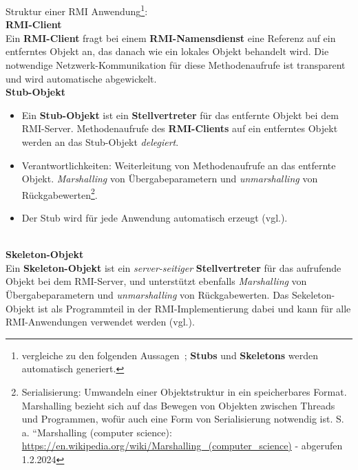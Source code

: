 \begin{tcolorbox}[enlarge top by=0.5cm,enlarge bottom by=0.5cm]
    Struktur einer RMI Anwendung\footnote{vergleiche zu den folgenden Aussagen~\cite[162 ff.]{HM05}; \textbf{Stubs} und \textbf{Skeletons} werden automatisch generiert.}:\\


    \noindent
    \textbf{RMI-Client}\\
    Ein \textbf{RMI-Client} fragt bei einem \textbf{RMI-Namensdienst} eine Referenz auf ein entferntes Objekt an, das danach wie ein lokales Objekt behandelt wird.
    Die notwendige Netzwerk-Kommunikation für diese Methodenaufrufe ist transparent und wird automatische abgewickelt.\\


    \noindent
    \textbf{Stub-Objekt}
    \begin{itemize}
        \item Ein \textbf{Stub-Objekt} ist ein \textbf{Stellvertreter} für das entfernte Objekt bei dem RMI-Server.
        Methodenaufrufe des \textbf{RMI-Clients} auf ein entferntes Objekt werden an das Stub-Objekt \textit{delegiert}.
        \item Verantwortlichkeiten: Weiterleitung von Methodenaufrufe an das entfernte Objekt. \textit{Marshalling} von Übergabeparametern und \textit{unmarshalling} von Rückgabewerten\footnote{
          Serialisierung: Umwandeln einer Objektstruktur in ein speicherbares Format. Marshalling bezieht sich auf das Bewegen von Objekten zwischen Threads und Programmen, wofür auch eine Form von Serialisierung notwendig ist. S. a. ``Marshalling (computer science): \url{https://en.wikipedia.org/wiki/Marshalling_(computer_science)} - abgerufen 1.2.2024
        }.
        \item Der Stub wird für jede Anwendung automatisch erzeugt (vgl.\cite[313]{Oec22}).
    \end{itemize}\\

    \noindent
    \textbf{Skeleton-Objekt}\\
   Ein \textbf{Skeleton-Objekt} ist ein \textit{server-seitiger} \textbf{Stellvertreter} für das aufrufende Objekt bei dem RMI-Server, und unterstützt ebenfalls  \textit{Marshalling} von Übergabeparametern und \textit{unmarshalling} von Rückgabewerten. Das Sekeleton-Objekt ist als Programmteil in der RMI-Implementierung dabei und kann für alle RMI-Anwendungen verwendet werden (vgl.\cite[313]{Oec22}).\\


\end{tcolorbox}
